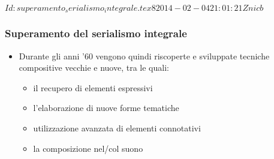 %
%
\svnInfo $Id: superamento_serialismo_integrale.tex 8 2014-02-04 21:01:21Z nicb $

\setcounter{ms}{0}
\begin{frame}
    \frametitle{Superamento del serialismo integrale}

    \begin{itemize}

        \item Durante gli anni '60 vengono quindi riscoperte
            e sviluppate tecniche compositive
            vecchie e nuove, tra le quali:

        \begin{itemize}

            \item il recupero di elementi espressivi

            \item l'elaborazione di nuove forme tematiche

            \item utilizzazione avanzata di elementi connotativi

            \item la composizione nel/col suono

        \end{itemize}

    \end{itemize}

\end{frame}
